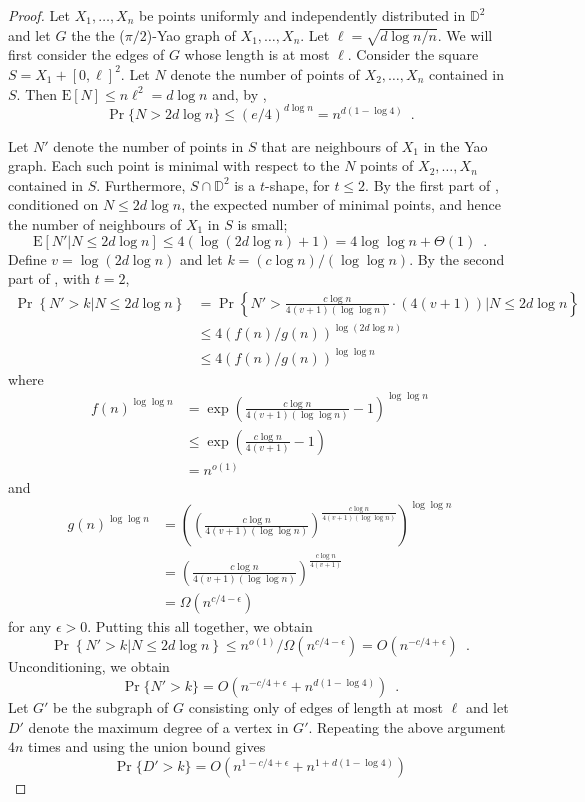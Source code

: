 \documentclass[lotsofwhite,charterfonts]{patmorin}
\newcommand{\D}{\mathbb{D}}
\newcommand{\PROB}{\Pr}
\newcommand{\EXP}{\mathrm{E}}
\begin{document}
\begin{proof}
Let $X_1,\ldots,X_n$ be points uniformly and independently distributed in
$\D^2$ and let $G$ the the ($\pi/2$)-Yao graph of $X_1,\ldots,X_n$.
Let $\ell=\sqrt{d\log n/n}$.  We will first consider the edges of $G$ whose
length is at most $\ell$.  Consider the square $S=X_1+[0,\ell]^2$.  Let
$N$ denote the number of points of $X_2,\ldots,X_n$ contained in $S$.  Then
$\EXP[N] \le n\ell^2 = d\log n$ and, by , 
\[
   \Pr\{N > 2d\log n\} \le (e/4)^{d\log n} = n^{d(1-\log 4)} \enspace .
\]

Let $N'$ denote the number of points in $S$ that are neighbours of $X_1$
in the Yao graph.  Each such point is minimal with respect to the $N$
points of $X_2,\ldots,X_n$ contained in $S$.  Furthermore, $S\cap\D^2$ is
a $t$-shape, for $t\le 2$.  By the first part of ,
conditioned on $N \le 2d\log n$, the expected number of minimal points, and
hence the number of neighbours of $X_1$
in $S$ is small;
\[
   \EXP[N'|N \le 2d\log n]
        \le 4(\log(2d\log n) + 1) 
          = 4\log\log n + \Theta(1)\enspace .
\]
Define $v=\log(2d\log n)$ and
let $k=(c\log n)/(\log\log n)$.  By the second part of
, with $t=2$,
\[
  \begin{aligned}
    \PROB\left\{N'> k|N\le 2d\log n\right\}  
    & = \PROB\left\{N'> \frac{c\log n}{4(v+1)(\log\log n)}\cdot(4(v+1)) |N\le 2d\log n\right\} \\
    & \le 4(f(n)/ g(n))^{\log(2d\log n)} \\
    & \le 4(f(n)/ g(n))^{\log\log n}
  \end{aligned}
\]
where
\[
  \begin{aligned}
   f(n)^{\log\log n}
    & = \exp\left(\frac{c\log n}{4(v+1)(\log\log n)}-1\right)^{\log\log n} \\
    & \le \exp\left(\frac{c\log n}{4(v+1)}-1\right) \\
    & = n^{o(1)}
  \end{aligned}
\]
and 
\[
  \begin{aligned}
   g(n)^{\log\log n}
    & = \left( 
          \left(\frac{c\log n}{4(v+1)(\log\log n)}\right)^
           {\frac{c\log n}{4(v+1)(\log\log n)}}
        \right)^{\log \log n} \\
    & = \left(\frac{c\log n}{4(v+1)(\log\log n)}\right)^
           {\frac{c\log n}{4(v+1)}} \\
    & = \Omega(n^{c/4-\epsilon})
  \end{aligned}
\]
for any $\epsilon > 0$.  Putting this all together, we obtain
\[
    \PROB\left\{N'> k|N\le 2d\log n\right\}  
     \le n^{o(1)}/\Omega(n^{c/4-\epsilon}) = O(n^{-c/4+\epsilon}) \enspace.
\]
Unconditioning, we obtain
\[
   \PROB\{N' > k\} = O(n^{-c/4+\epsilon} + n^{d(1-\log 4)}) \enspace .
\]
Let $G'$ be the subgraph of $G$ consisting only of edges of length at most
$\ell$ and let $D'$ denote the maximum degree of a vertex in $G'$.
Repeating the above argument $4n$ times and using the union bound gives
\[
   \PROB\{D' > k\} = O(n^{1-c/4+\epsilon} + n^{1+d(1-\log 4)})
\]


\end{proof}
\end{document}
